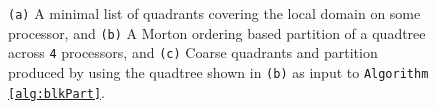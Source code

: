 \begin{figure}
  \begin{center}
  \end{center}
  \caption{{\tt(a)} A minimal list of quadrants covering the local
  domain on some processor, and {\tt(b)} A Morton ordering based
  partition of a quadtree across {\tt4} processors, and {\tt(c)}
  Coarse quadrants and partition produced by using the quadtree shown
  in {\tt(b)} as input to {\tt Algorithm \ref{alg:blkPart}}.}
\end{figure}

